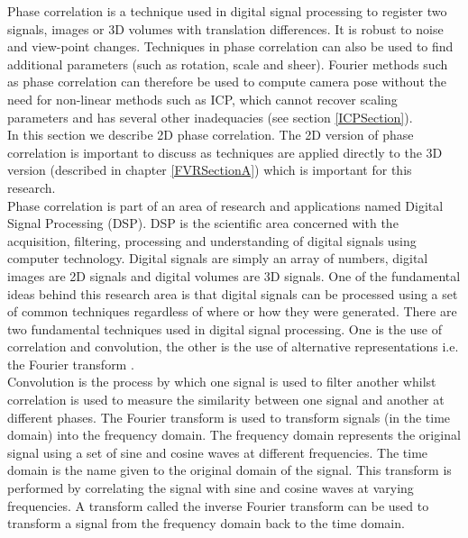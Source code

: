 Phase correlation is a technique used in digital signal processing to register two signals, images or 3D volumes with translation differences. It is robust to noise and view-point changes. Techniques in phase correlation can also be used to find additional parameters (such as rotation, scale and sheer). Fourier methods such as phase correlation can therefore be used to compute camera pose without the need for non-linear methods such as ICP, which cannot recover scaling parameters and has several other inadequacies (see section \ref{ICPSection}). \\ 

In this section we describe 2D phase correlation. The 2D version of phase correlation is important to discuss as techniques are applied directly to the 3D version (described in chapter \ref{FVRSectionA}) which is important for this research. \\

Phase correlation is part of an area of research and applications named Digital Signal Processing (DSP). DSP is the scientific area concerned with the acquisition, filtering, processing and understanding of digital signals using computer technology. Digital signals are simply an array of numbers, digital images are 2D signals and digital volumes are 3D signals. One of the fundamental ideas behind this research area is that digital signals can be processed using a set of common techniques regardless of where or how they were generated. There are two fundamental techniques used in digital signal processing. One is the use of correlation and convolution, the other is the use of alternative representations i.e. the Fourier transform \cite{Smith97Scientist}. \\

Convolution is the process by which one signal is used to filter another whilst correlation is used to measure the similarity between one signal and another at different phases. The Fourier transform is used to transform signals (in the time domain) into the frequency domain. The frequency domain represents the original signal using a set of sine and cosine waves at different frequencies. The time domain is the name given to the original domain of the signal. This transform is performed by correlating the signal with sine and cosine waves at varying frequencies. A transform called the inverse Fourier transform can be used to transform a signal from the frequency domain back to the time domain. \\

